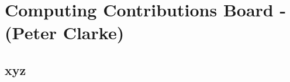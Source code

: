\chapter{Computing Contributions Board - (Peter Clarke)}
\label{ch:ccb}

\section{xyz}
\label{sec:ccb:xyz}  %

